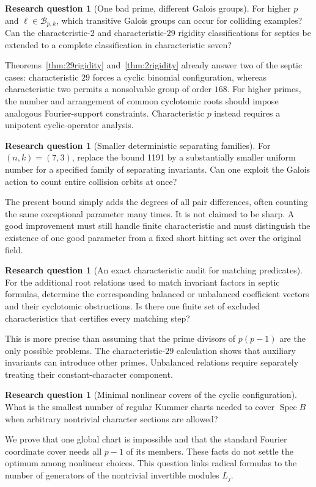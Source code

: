 \documentclass[11pt,a4paper]{article}
\theoremstyle{definition}
\newtheorem{question}[theorem]{Research question}
\theoremstyle{remark}
\newcommand{\Spec}{\operatorname{Spec}}
\begin{document}
\begin{question}[One bad prime, different Galois groups]
For higher $p$ and $\ell\in\mathcal B_{p,k}$, which transitive
Galois groups can occur for colliding examples? Can the characteristic-$2$
and characteristic-$29$ rigidity classifications for septics be extended
to a complete classification in characteristic seven?
\end{question}
Theorems~\ref{thm:29rigidity} and~\ref{thm:2rigidity} already answer two
of the septic cases: characteristic $29$ forces a cyclic binomial
configuration, whereas characteristic two permits a nonsolvable group of
order $168$. For higher primes, the number and arrangement of common
cyclotomic roots should impose analogous Fourier-support constraints.
Characteristic $p$ instead requires a unipotent cyclic-operator analysis.

\begin{question}[Smaller deterministic separating families]
For $(n,k)=(7,3)$, replace the bound 1191 by a substantially smaller uniform
number for a specified family of separating invariants. Can one exploit
the Galois action to count entire collision orbits at once?
\end{question}
The present bound simply adds the degrees of all pair differences, often
counting the same exceptional parameter many times. It is not claimed to
be sharp. A good improvement must still handle finite characteristic and
must distinguish the existence of one good parameter from a fixed short
hitting set over the original field.

\begin{question}[An exact characteristic audit for matching predicates]
For the additional root relations used to match invariant factors in
septic formulas, determine the corresponding balanced or unbalanced
coefficient vectors and their cyclotomic obstructions. Is there one finite
set of excluded characteristics that certifies every matching step?
\end{question}
This is more precise than assuming that the prime divisors of $p(p-1)$
are the only possible problems. The characteristic-$29$ calculation shows
that auxiliary invariants can introduce other primes. Unbalanced
relations require separately treating their constant-character component.

\begin{question}[Minimal nonlinear covers of the cyclic configuration]
What is the smallest number of regular Kummer charts needed to cover
$\Spec B$ when arbitrary nontrivial character sections are allowed?
\end{question}
We prove that one global chart is impossible and that the standard Fourier
coordinate cover needs all $p-1$ of its members. These facts do not settle
the optimum among nonlinear choices. This question links radical formulas
to the number of generators of the nontrivial invertible modules $L_j$.
\end{document}
